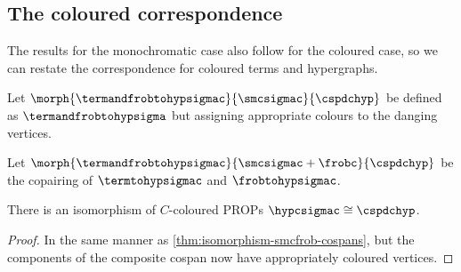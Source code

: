 \subsection{The coloured correspondence}

The results for the monochromatic case also follow for the coloured case, so we
can restate the correspondence for coloured terms and hypergraphs.

\begin{definition}
    Let \(\morph{\termandfrobtohypsigmac}{\smcsigmac}{\cspdchyp}\) be defined
    as \(\termandfrobtohypsigma\) but assigning appropriate colours to the
    danging vertices.
\end{definition}

\begin{definition}
    Let \(
    \morph{\termandfrobtohypsigmac}{\smcsigmac + \frobc}{\cspdchyp}
    \) be the copairing of \(\termtohypsigmac\) and
    \(\frobtohypsigmac\).
\end{definition}

\begin{theorem}
    There is an isomorphism of \(C\)-coloured PROPs
    \(\hypcsigmac \cong \cspdchyp\).
\end{theorem}
\begin{proof}
    In the same manner as \cref{thm:isomorphism-smcfrob-cospans}, but the
    components of the composite cospan now have appropriately coloured vertices.
\end{proof}